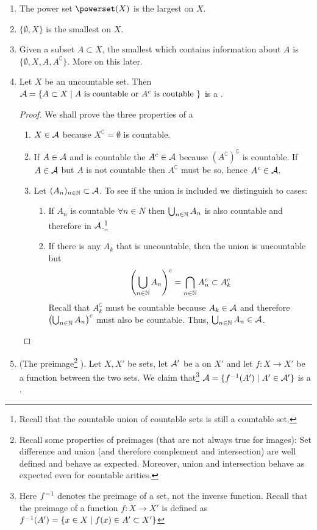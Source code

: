 \begin{eg}$ $\newline
	\begin{enumerate}
		\item The power set $\powerset (X)$ is the largest \siga on $X$.
		\item $\{\emptyset, X\}$ is the smallest \siga on $X$.
		\item Given a subset $A \subset X$, the smallest \siga which contains information about $A$ is $\{\emptyset, X, A, A^\complement\}$. More on this later.
		\item Let $X$ be an uncountable set. Then $\mathcal{A} = \{ A \subset X \mid A \text{ is countable or } A^c \text{ is coutable }\}$ is a \siga.
		
		\begin{proof} We shall prove the three properties of a \siga
			\begin{enumerate}
				\item $X \in \mathcal{A}$ because $X^\complement = \emptyset$ is countable.
				\item If $A \in \mathcal{A}$ and is countable the $A^c \in \mathcal{A}$ because $(A^\complement)^\complement$ is countable. If $A \in \mathcal{A}$ but $A$ is not countable then $A^\complement$ must be so, hence $A^c \in \mathcal{A}$.
				\item Let $(A_n)_{n \in \mathbb{N}} \subset \mathcal{A}$. To see if the union is included we distinguish to cases:
				\begin{enumerate}
					\item If $A_n$ is countable $\forall n \in N$ then $\bigcup_{n \in \mathbb{N}} A_n$ is also countable and therefore in $\mathcal{A}$.\footnote{Recall that the countable union of countable sets is still a countable set.}
					\item If there is any $A_k$ that is uncountable, then the union is uncountable but
					\begin{align*}
						\left(\bigcup_{n \in \mathbb{N}} A_n\right)^c = \bigcap_{n \in \mathbb{N}} A_n^c \subset A_k^c
					\end{align*}
					Recall that $A_k^\complement$ must be countable because $A_k \in \mathcal{A}$ and therefore $\left(\bigcup_{n \in \mathbb{N}} A_n\right)^c$ must also be countable. Thus, $\bigcup_{n \in \mathbb{N}} A_n \in \mathcal{A}$.
				\end{enumerate}
			\end{enumerate}
		\end{proof}
		\item (The preimage\footnote{Recall some properties of preimages (that are not always true for images): Set difference and union (and therefore complement and intersection) are well defined and behave as expected. Moreover, union and intersection behave as expected even for countable arities.} \siga). Let $X, X'$ be sets, let $\mathcal{A}'$ be a \siga on $X'$ and let $f : X \to X'$ be a function between the two sets. We claim that\footnote{Here $f^{-1}$ denotes the preimage of a set, not the inverse function. Recall that the preimage of a function $f: X \to X'$ is defined as $f^{-1}(A') = \{x \in X \mid f(x) \in A' \subset X'\}$} $\mathcal{A} = \{f^{-1} (A') \mid A' \in \mathcal{A}'\}$ is a \siga.

\end{enumerate}
\end{eg}
